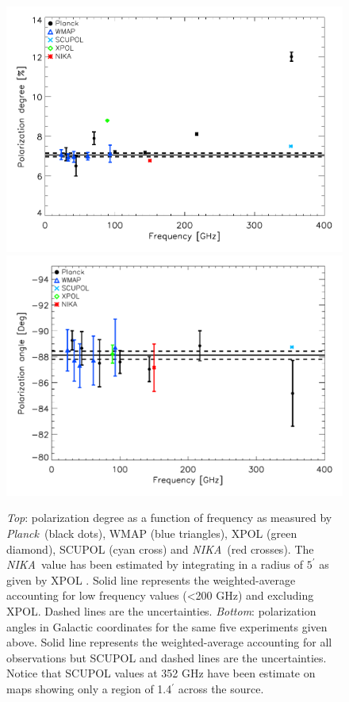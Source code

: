 \documentclass[twocolumn,traditabstract]{aa}
\def\NIKA{\textit{NIKA}}
\def\Planck{\textit{Planck}}
\begin{document}
\begin{figure}
  \centering
          { \includegraphics[width=1\linewidth,keepaspectratio]{figures/pdegree_comparison.pdf}}
          { \includegraphics[width=1\linewidth,keepaspectratio]{figures/angle_comparison.pdf}} 
            \caption{{\it Top}: polarization degree as a function of frequency as measured by \Planck\ (black dots), WMAP (blue triangles), XPOL (green diamond), SCUPOL (cyan cross) and \NIKA\ (red crosses). The \NIKA\ value has been estimated by integrating in a radius of $5^{\prime}$ as given by XPOL \citep{aumont2010}. Solid line represents the weighted-average accounting for low frequency values (\textless 200 GHz) and excluding XPOL.
            Dashed lines are the uncertainties.
            {\it Bottom}: polarization angles in Galactic coordinates for the same five experiments given above. Solid line represents the weighted-average accounting for all observations but SCUPOL and dashed lines are the uncertainties.
Notice that SCUPOL values \citep{scubapol} at 352 GHz have been estimate on maps showing only a region of 1.4$^\prime$ across the source.}
\label{crab_p_angle_comparison}		
  \end{figure}
\end{document}
